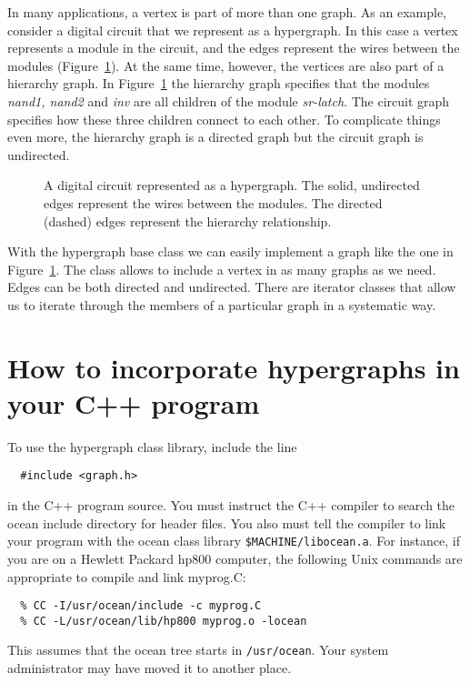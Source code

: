 In many applications, a vertex is part of more than one graph. As an example,
consider a digital circuit that we represent as a hypergraph. In this case
a vertex represents a module in the circuit, and the edges represent the wires
between the modules (Figure~\ref{f-sr-latch}). At the same time, however, the
vertices are also part of a hierarchy graph. In Figure~\ref{f-sr-latch} the
hierarchy graph specifies that the modules {\sl nand1, nand2\/} and {\sl inv\/}
are all children of the module {\sl sr-latch\/}. The circuit graph specifies
how these three children connect to each other. To complicate things even more,
the hierarchy graph is a directed graph but the circuit graph is undirected.

\begin{figure}[hbt]
\caption{\label{f-sr-latch}
A digital circuit represented as a hypergraph. The solid, undirected
edges represent the wires between the modules. The directed (dashed) edges
represent the hierarchy relationship.}
\end{figure}

With the hypergraph base class we can easily implement a graph like the one
in Figure~\ref{f-sr-latch}. The class allows to include a vertex in as many
graphs as we need. Edges can be both directed and undirected. There are
iterator classes that allow us to iterate through the members of a particular
graph in a systematic way.

\section{How to incorporate hypergraphs in your C++ program}
To use the hypergraph class library, include the line
\begin{verbatim}
  #include <graph.h>
\end{verbatim}
in the C++ program source. You must instruct the C++ compiler to search the
ocean include directory for header files. You also must tell the compiler to
link your program with the ocean class library {\tt \$MACHINE/libocean.a}. For
instance, if you are on a Hewlett Packard hp800 computer, the following Unix
commands are appropriate to compile and link myprog.C:
\begin{verbatim}
  % CC -I/usr/ocean/include -c myprog.C
  % CC -L/usr/ocean/lib/hp800 myprog.o -locean
\end{verbatim}
This assumes that the ocean tree starts in {\tt /usr/ocean}. Your system
administrator may have moved it to another place.

